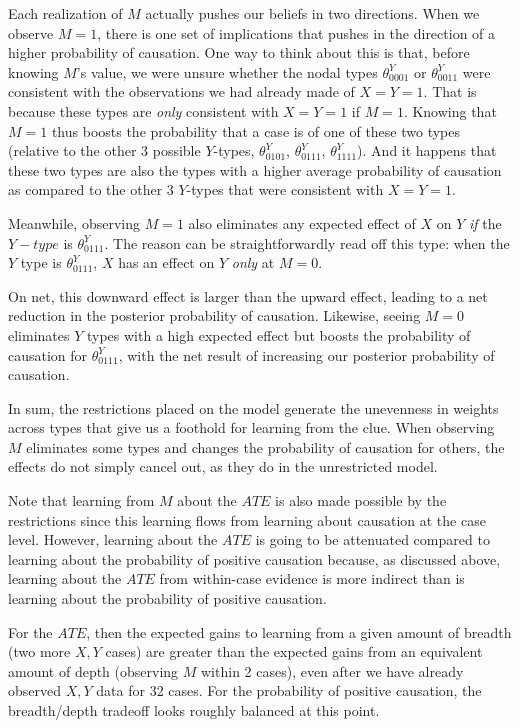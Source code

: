 \documentclass[
  12pt,
]{book}
\begin{document}
Each realization of \(M\) actually pushes our beliefs in two directions. When we observe \(M=1\), there is one set of implications that pushes in the direction of a higher probability of causation. One way to think about this is that, before knowing \(M\)'s value, we were unsure whether the nodal types \(\theta^Y_{0001}\) or \(\theta^Y_{0011}\) were consistent with the observations we had already made of \(X=Y=1\). That is because these types are \emph{only} consistent with \(X=Y=1\) if \(M=1\). Knowing that \(M=1\) thus boosts the probability that a case is of one of these two types (relative to the other 3 possible \(Y\)-types, \(\theta^Y_{0101}\), \(\theta^Y_{0111}\), \(\theta^Y_{1111}\)). And it happens that these two types are also the types with a higher average probability of causation as compared to the other 3 \(Y\)-types that were consistent with \(X=Y=1\).

Meanwhile, observing \(M=1\) also eliminates any expected effect of \(X\) on \(Y\) \emph{if} the \(Y-type\) is \(\theta^Y_{0111}\). The reason can be straightforwardly read off this type: when the \(Y\) type is \(\theta^Y_{0111}\), \(X\) has an effect on \(Y\) \emph{only} at \(M=0\).

On net, this downward effect is larger than the upward effect, leading to a net reduction in the posterior probability of causation. Likewise, seeing \(M=0\) eliminates \(Y\) types with a high expected effect but boosts the probability of causation for \(\theta^Y_{0111}\), with the net result of increasing our posterior probability of causation.

In sum, the restrictions placed on the model generate the unevenness in weights across types that give us a foothold for learning from the clue. When observing \(M\) eliminates some types and changes the probability of causation for others, the effects do not simply cancel out, as they do in the unrestricted model.

Note that learning from \(M\) about the \(ATE\) is also made possible by the restrictions since this learning flows from learning about causation at the case level. However, learning about the \(ATE\) is going to be attenuated compared to learning about the probability of positive causation because, as discussed above, learning about the \(ATE\) from within-case evidence is more indirect than is learning about the probability of positive causation.

For the \(ATE\), then the expected gains to learning from a given amount of breadth (two more \(X, Y\) cases) are greater than the expected gains from an equivalent amount of depth (observing \(M\) within 2 cases), even after we have already observed \(X, Y\) data for 32 cases. For the probability of positive causation, the breadth/depth tradeoff looks roughly balanced at this point.
\end{document}
